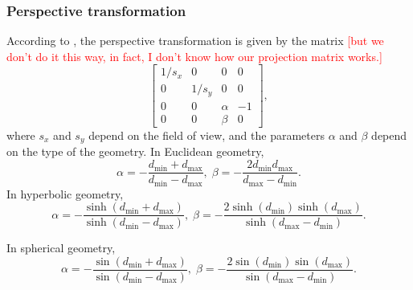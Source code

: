 \subsubsection{Perspective transformation}
According to \cite{Szirmay-Kalos2022}, the perspective transformation is given by the matrix \textcolor{red}{[but we don't do it this way, in fact, I don't know how our projection matrix works.]}
\begin{equation*}
    \begin{bmatrix}
        1 / s_x & 0       & 0      & 0  \\
        0       & 1 / s_y & 0      & 0  \\
        0       & 0       & \alpha & -1 \\
        0       & 0       & \beta  & 0
    \end{bmatrix},
\end{equation*}
where $s_x$ and $s_y$ depend on the field of view, and the parameters $\alpha$ and $\beta$ depend on the type of the geometry.
In Euclidean geometry,
\begin{equation*}
    \alpha = -\frac{d_\mathrm{min} + d_\mathrm{max}}{d_\mathrm{min} - d_\mathrm{max}}, \;
    \beta = -\frac{2d_\mathrm{min}d_\mathrm{max}}{d_\mathrm{max} - d_\mathrm{min}}.
\end{equation*}
In hyperbolic geometry,
\begin{equation*}
    \alpha = -\frac{\sinh(d_\mathrm{min} + d_\mathrm{max})}{\sinh(d_\mathrm{min} - d_\mathrm{max})}, \;
    \beta = -\frac{2\sinh(d_\mathrm{min}) \sinh(d_\mathrm{max})}{\sinh(d_\mathrm{max} - d_\mathrm{min})}.
\end{equation*}

In spherical geometry,
\begin{equation*}
    \alpha = -\frac{\sin(d_\mathrm{min} + d_\mathrm{max})}{\sin(d_\mathrm{min} - d_\mathrm{max})}, \;
    \beta = -\frac{2\sin(d_\mathrm{min}) \sin(d_\mathrm{max})}{\sin(d_\mathrm{max} - d_\mathrm{min})}.
\end{equation*}

